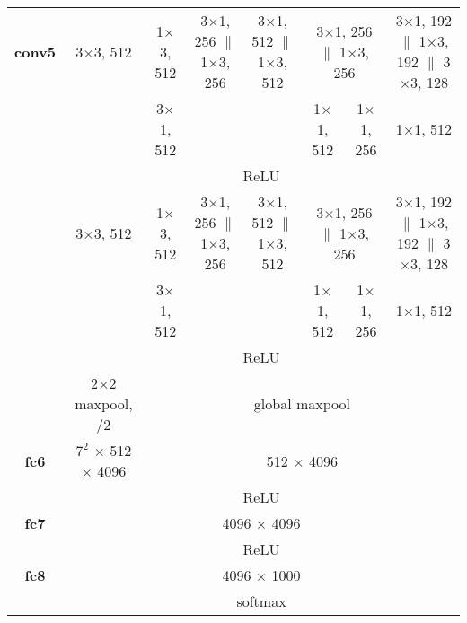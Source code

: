 \documentclass[thesis]{subfiles}
\begin{document}
{\begin{landscape}
{\begin{table*}[p]
\begin{tabular}{@{}|c||c|c|c|c|c|c|c|c|@{}}
    \textbf{conv5} & \multicolumn{2}{c|}{3$\times$3, 512} & 1$\times$3, 512 & 3$\times$1, 256 $\|$ 1$\times$3, 256 & 3$\times$1, 512 $\|$ 1$\times$3, 512 & \multicolumn{2}{c|}{3$\times$1, 256 $\|$ 1$\times$3, 256} & 3$\times$1, 192 $\|$ 1$\times$3, 192 $\|$ 3$\times$3, 128\\
    \cline{4-4} \cline{7-9}
    & \multicolumn{2}{c|}{} & 3$\times$1, 512 & & & 1$\times$1, 512 & 1$\times$1, 256 & 1$\times$1, 512\\
    \cline{2-9}
	& \multicolumn{8}{c|}{ReLU}\\
    \cline{2-9}
	& \multicolumn{2}{c|}{3$\times$3, 512} & 1$\times$3, 512 & 3$\times$1, 256 $\|$ 1$\times$3, 256 & 3$\times$1, 512 $\|$ 1$\times$3, 512 & \multicolumn{2}{c|}{3$\times$1, 256 $\|$ 1$\times$3, 256} & 3$\times$1, 192 $\|$ 1$\times$3, 192 $\|$ 3$\times$3, 128\\
	\cline{4-4} \cline{7-9}
    & \multicolumn{2}{c|}{} & 3$\times$1, 512 & & & 1$\times$1, 512 & 1$\times$1, 256 & 1$\times$1, 512\\
    \cline{2-9}
	& \multicolumn{8}{c|}{ReLU}\\
    \cline{2-9}
	& 2$\times$2 maxpool, /2 & \multicolumn{7}{c|}{global maxpool}\\
	\hline
	\textbf{fc6} & $7^2$ $\times$ 512 $\times$ 4096 & \multicolumn{7}{c|}{512 $\times$ 4096}\\
    \cline{2-9}
	& \multicolumn{8}{c|}{ReLU}\\
    \hline
	\textbf{fc7} & \multicolumn{8}{c|}{4096 $\times$ 4096}\\
    \cline{2-9}
	& \multicolumn{8}{c|}{ReLU}\\
    \hline
	\textbf{fc8} & \multicolumn{8}{c|}{4096 $\times$ 1000}\\
    \cline{2-9}
	& \multicolumn{8}{c|}{softmax}\\
    \hline
\end{tabular}
\label{table:vggarch}
\end{table*}
}
\end{landscape}
}
    
\end{document}
